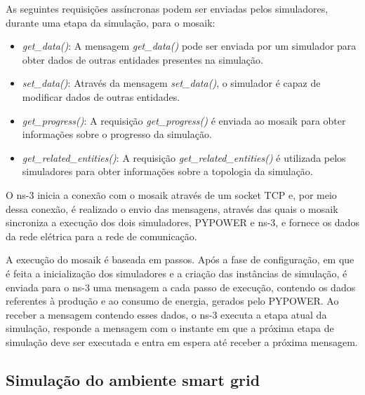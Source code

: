 \documentclass[cic,tc]{iiufrgs}
\begin{document}
As seguintes requisições assíncronas podem ser enviadas pelos simuladores, durante uma etapa da simulação, para o mosaik:

\begin{itemize}
\item \emph{get_data()}:​ ​​A mensagem \emph{get_data()} pode ser enviada​ por um simulador​ para obter dados de outras​ entidades​ ​presentes na simulação.
​\item \emph{set_data()}:​ Através da mensagem \emph{set_data()}, ​o simulador é capaz de​ ​modificar dados de outras entidades.
\item \emph{get_progress()}:​ ​​​A​ requisiçã​o​​​ \emph{get_progress()} é enviada​ ao mosaik​ para ​obter informações sobre o progresso da simulação.
​​\item \emph{get_related_entities()}:​ A requisição \emph{get_related_entities()} é utilizada pelos simuladores para obter informações sobre a topologia da simulação.
\end{itemize}

O ns-3 inicia a conexão com o mosaik através de um socket TCP e, por meio dessa conexão, é realizado o envio das mensagens, através das quais o mosaik sincroniza a execução dos dois simuladores, PYPOWER e ns-3, e fornece os dados da rede elétrica para a rede de comunicação.
 
A execução do mosaik é baseada em passos. Após a fase de configuração, em que é feita a inicialização dos simuladores e a criação das instâncias de simulação, é enviada para o ns-3 uma mensagem a cada passo de execução, contendo os dados referentes à produção e ao consumo de energia, gerados pelo PYPOWER. Ao receber a mensagem contendo esses dados, o ns-3 executa a etapa atual da simulação, responde a mensagem com o instante em que a próxima etapa de simulação deve ser executada e entra em espera até receber a próxima mensagem.

\subsection{Simulação do ambiente smart grid}
\label{subsecestrut}
\end{document}
